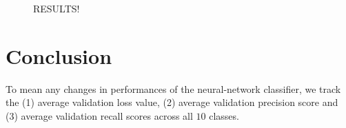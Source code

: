 \documentclass[12pt,letterpaper]{article}
\begin{document}

\begin{figure}[H]
\label{results}
RESULTS!
\end{figure}

\section*{Conclusion}To mean any changes in performances of the neural-network classifier, we track the  (1) average validation loss value, (2) average validation precision score and (3) average validation recall scores across all $10$ classes.




\end{document}
